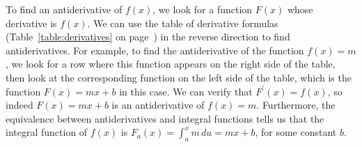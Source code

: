 			To find an antiderivative of $f(x)$,
			we look for a function $F(x)$ whose derivative is $f(x)$.
			We can use the table of derivative formulas
			(Table~\ref{table:derivatives} on page~\pageref{table:derivatives})
			in the reverse direction to find antiderivatives.
			For example,
			to find the antiderivative of the function $f(x) = m$,
			we look for a row where this function appears on the right side of the table,
			then look at the corresponding function on the left side of the table,
			which is the function $F(x) = mx + b$ in this case.
			We can verify that $F^{\prime\!}(x) = f(x)$,
			so indeed $F(x) = mx + b$ is an antiderivative of $f(x) = m$.
			Furthermore,
			the equivalence between antiderivatives and integral functions
			tells us that the integral function of $f(x)$ is $F_a(x) = \int_a^x m\,du = mx + b$,
			for some constant $b$.




			
			

